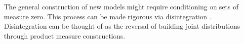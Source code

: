 The general construction of new models might require conditioning
on sets of measure zero. This process can be made rigorous
via disintegration \citep{chang1997conditioning}. Disintegration can
be thought of as the reversal of building joint distributions through
product measure constructions.







